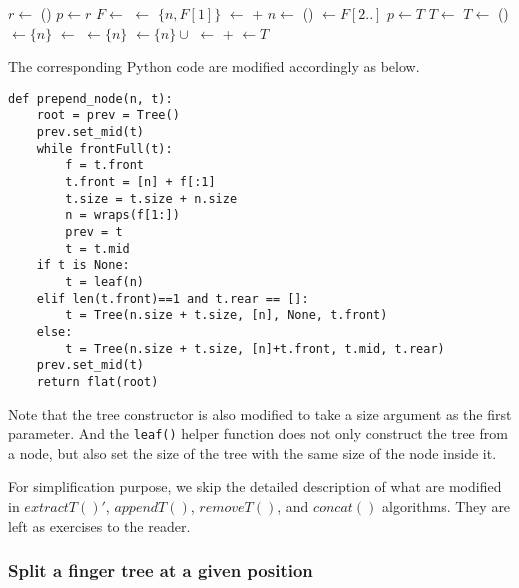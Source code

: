 \documentclass[UTF8]{article}
\begin{document}
\begin{algorithmic}
  \State $r \gets $ ()
  \State $p \gets r$
  \State {}
    \State $F \gets $ 
    \State {} $\gets$ $\{n, F[1]\}$
    \State {} $\gets$  +  
    \State $n \gets$ ()
    \State {} $\gets F[2..]$
    \State $p \gets T$
    \State $T \gets$ 
  \EndWhile
    \State $T \gets$ ()
    \State {}$\gets \{ n \}$
    \State {} $\gets$ 
    \State {} $\gets \{ n \}$
  \Else
    \State {} $\gets \{ n \} \cup $ 
  \EndIf
  \State {} $\gets$  +  
  \State {} $\gets T$
  \State \Return {}
\EndFunction
\end{algorithmic}

The corresponding Python code are modified accordingly as below.

\lstset{language=Python}
\begin{lstlisting}
def prepend_node(n, t):
    root = prev = Tree()
    prev.set_mid(t)
    while frontFull(t):
        f = t.front
        t.front = [n] + f[:1]
        t.size = t.size + n.size
        n = wraps(f[1:])
        prev = t
        t = t.mid
    if t is None:
        t = leaf(n)
    elif len(t.front)==1 and t.rear == []:
        t = Tree(n.size + t.size, [n], None, t.front)
    else:
        t = Tree(n.size + t.size, [n]+t.front, t.mid, t.rear)
    prev.set_mid(t)
    return flat(root)
\end{lstlisting}

Note that the tree constructor is also modified to take a size argument
as the first parameter. And the \verb|leaf()| helper function does not
only construct the tree from a node, but also set the size of the tree
with the same size of the node inside it.

For simplification purpose, we skip the detailed description of what are modified in
$extractT()'$, $appendT()$, $removeT()$, and $concat()$ algorithms. They are left as exercises to the
reader.

\subsubsection{Split a finger tree at a given position}
\end{document}
